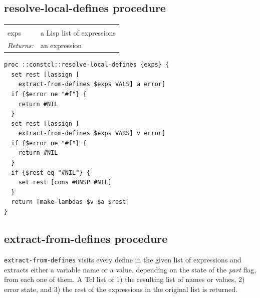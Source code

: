 \documentclass[twoside,9pt]{report}
\begin{document}
\subsection{resolve-local-defines procedure}
\label{resolve-local-defines-procedure}
\noindent\begin{tabular}{ |p{1.5cm} p{8cm}| }
\hline
\rowcolor[HTML]{CCCCCC} \multicolumn{2}{|l|}{\bf resolve-local-defines} \\
exps & a Lisp list of expressions \\
\textit{Returns:} & an expression \\
\hline
\end{tabular}
\begin{lstlisting}
proc ::constcl::resolve-local-defines {exps} {
  set rest [lassign [
    extract-from-defines $exps VALS] a error]
  if {$error ne "#f"} {
    return #NIL
  }
  set rest [lassign [
    extract-from-defines $exps VARS] v error]
  if {$error ne "#f"} {
    return #NIL
  }
  if {$rest eq "#NIL"} {
    set rest [cons #UNSP #NIL]
  }
  return [make-lambdas $v $a $rest]
}
\end{lstlisting}
\subsection{extract-from-defines procedure}
\label{extract-from-defines-procedure}


\texttt{extract-from-defines} visits every define in the given list of expressions and extracts either a variable name or a value, depending on the state of the \emph{part} flag, from each one of them. A Tcl list of 1) the resulting list of names or values, 2) error state, and 3) the rest of the expressions in the original list is returned.
\end{document}
